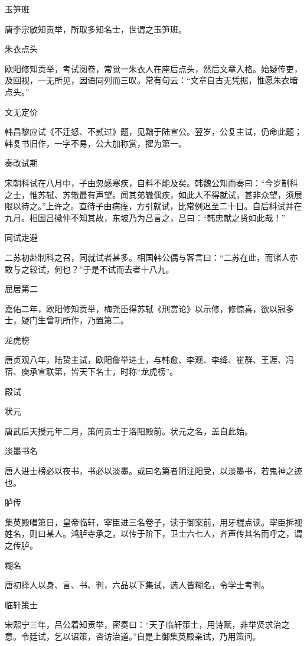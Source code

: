 \documentclass[a4paper,12pt,UTF8,twoside]{ctexbook}
\begin{document}
    玉笋班
    
    唐李宗敏知贡举，所取多知名士，世谓之玉笋班。
    
    朱衣点头
    
    欧阳修知贡举，考试阅卷，常觉一朱衣人在座后点头，然后文章入格。始疑传吏，及回视，一无所见，因语同列而三叹。常有句云：“文章自古无凭据，惟愿朱衣暗点头。”
    
    文无定价
    
    韩昌黎应试《不迁怒、不贰过》题，见黜于陆宣公。翌岁，公复主试，仍命此题；韩复书旧作，一字不易，公大加称赏，擢为第一。
    
    奏改试期
    
    宋朝科试在八月中，子由忽感寒疾，自料不能及矣。韩魏公知而奏曰：“今岁制科之士，惟苏轼、苏辙最有声望。闻其弟辙偶疾，如此人不得就试，甚非众望，须展限以待之。”上许之。直待子由病痊，方引就试，比常例迟至二十日。自后科试并在九月。相国吕徽仲不知其故，东坡乃为吕言之，吕曰：“韩忠献之贤如此哉！”
    
    同试走避
    
    二苏初赴制科之召，同就试者甚多。相国韩公偶与客言曰：“二苏在此，而诸人亦敢与之较试，何也？”于是不试而去者十八九。
    
    屈居第二
    
    嘉佑二年，欧阳修知贡举，梅尧臣得苏轼《刑赏论》以示修，修惊喜，欲以冠多士，疑门生曾巩所作，乃置第二。
    
    龙虎榜
    
    唐贞观八年，陆贽主试，欧阳詹举进士，与韩愈、李观、李绛、崔群、王涯、冯宿、庾承宣联第，皆天下名士，时称“龙虎榜”。
    
    殿试
    
    状元
    
    唐武后天授元年二月，策问贡士于洛阳殿前。状元之名，盖自此始。
    
    淡墨书名
    
    唐人进士榜必以夜书，书必以淡墨。或曰名第者阴注阳受，以淡墨书，若鬼神之迹也。
    
    胪传
    
    集英殿唱第日，皇帝临轩，宰臣进三名卷子，读于御案前，用牙棍点读。宰臣拆视姓名，则曰某人。鸿胪寺承之，以传于阶下，卫士六七人，齐声传其名而呼之，谓之传胪。
    
    糊名
    
    唐初择人以身、言、书、判，六品以下集试，选人皆糊名，令学士考判。
    
    临轩策士
    
    宋熙宁三年，吕公着知贡举，密奏曰：“天子临轩策士，用诗赋，非举贤求治之意。令廷试，乞以诏策，咨访治道。”自是上御集英殿亲试，乃用策问。
    
\end{document}
